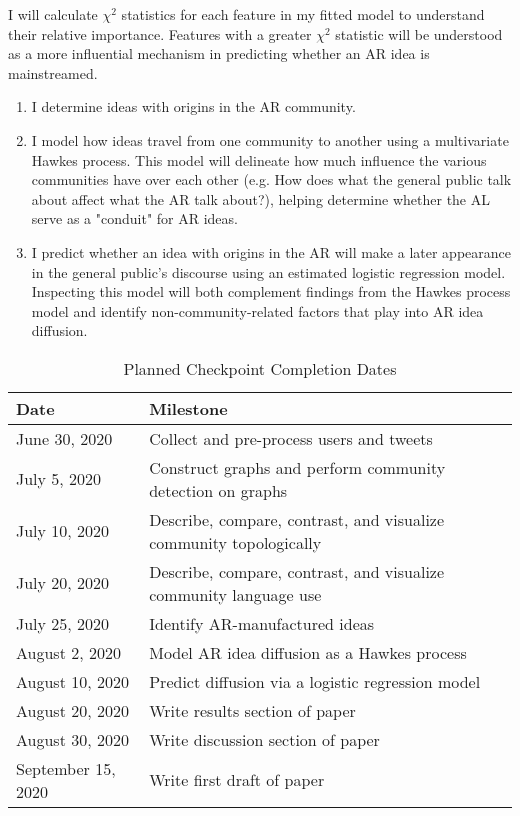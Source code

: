 \documentclass[acmlarge, screen, authorversion]{acmart}
\begin{document}
I will calculate $\chi^2$ statistics for each feature in my fitted model to understand their relative importance. Features with a greater $\chi^2$ statistic will be understood as a more influential mechanism in predicting whether an AR idea is mainstreamed.

\begin{enumerate}
    \item I determine ideas with origins in the AR community.
    \item I model how ideas travel from one community to another using a multivariate Hawkes process. This model will delineate how much influence the various communities have over each other (e.g. How does what the general public talk about affect what the AR talk about?), helping determine whether the AL serve as a "conduit" for AR ideas.
    \item I predict whether an idea with origins in the AR will make a later appearance in the general public's discourse using an estimated logistic regression model. Inspecting this model will both complement findings from the Hawkes process model and identify non-community-related factors that play into AR idea diffusion.
\end{enumerate}


\begin{table}[htbp!]

  \caption{Planned Checkpoint Completion Dates}
  \label{table:timetable}
  
  \begin{tabular}{ l l  }
  
    \toprule
     Date & Milestone\\ 
    \midrule
June 30, 2020 & Collect and pre-process users and tweets\\
 \hline
July 5, 2020 & Construct graphs and perform community detection on graphs\\
  \hline
July 10, 2020 & Describe, compare, contrast, and visualize community topologically\\
  \hline
  July 20, 2020 & Describe, compare, contrast, and visualize community language use\\
  \hline
  July 25, 2020 & Identify AR-manufactured ideas\\
  \hline
  August 2, 2020 &  Model AR idea diffusion as a Hawkes process\\
  \hline
  August 10, 2020 & Predict diffusion via a logistic regression model\\
    \hline
  August 20, 2020 & Write results section of paper\\
      \hline
  August 30, 2020 & Write discussion section of paper\\
        \hline
  September 15, 2020 & Write first draft of paper\\
   \bottomrule
\end{tabular}
\end{table}
\end{document}

